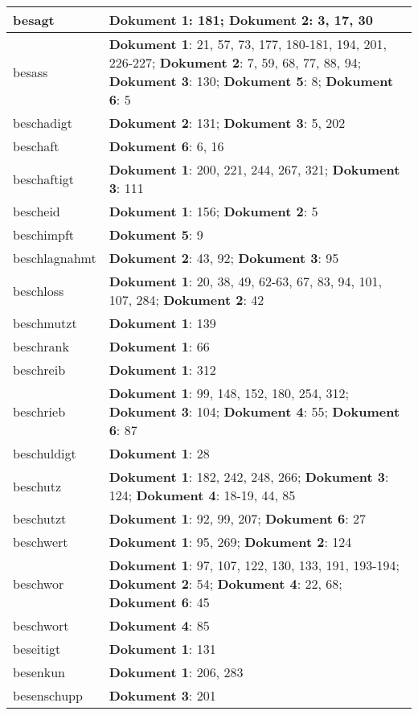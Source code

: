 \documentclass[a5paper]{article}
\begin{document}
\begin{longtable}[l]{|l|p{3in}|}
\hline
besagt & \textbf{Dokument 1}: 181; \textbf{Dokument 2}: 3, 17, 30 \\
\hline
besass & \textbf{Dokument 1}: 21, 57, 73, 177, 180-181, 194, 201, 226-227; \textbf{Dokument 2}: 7, 59, 68, 77, 88, 94; \textbf{Dokument 3}: 130; \textbf{Dokument 5}: 8; \textbf{Dokument 6}: 5 \\
\hline
beschadigt & \textbf{Dokument 2}: 131; \textbf{Dokument 3}: 5, 202 \\
\hline
beschaft & \textbf{Dokument 6}: 6, 16 \\
\hline
beschaftigt & \textbf{Dokument 1}: 200, 221, 244, 267, 321; \textbf{Dokument 3}: 111 \\
\hline
bescheid & \textbf{Dokument 1}: 156; \textbf{Dokument 2}: 5 \\
\hline
beschimpft & \textbf{Dokument 5}: 9 \\
\hline
beschlagnahmt & \textbf{Dokument 2}: 43, 92; \textbf{Dokument 3}: 95 \\
\hline
beschloss & \textbf{Dokument 1}: 20, 38, 49, 62-63, 67, 83, 94, 101, 107, 284; \textbf{Dokument 2}: 42 \\
\hline
beschmutzt & \textbf{Dokument 1}: 139 \\
\hline
beschrank & \textbf{Dokument 1}: 66 \\
\hline
beschreib & \textbf{Dokument 1}: 312 \\
\hline
beschrieb & \textbf{Dokument 1}: 99, 148, 152, 180, 254, 312; \textbf{Dokument 3}: 104; \textbf{Dokument 4}: 55; \textbf{Dokument 6}: 87 \\
\hline
beschuldigt & \textbf{Dokument 1}: 28 \\
\hline
beschutz & \textbf{Dokument 1}: 182, 242, 248, 266; \textbf{Dokument 3}: 124; \textbf{Dokument 4}: 18-19, 44, 85 \\
\hline
beschutzt & \textbf{Dokument 1}: 92, 99, 207; \textbf{Dokument 6}: 27 \\
\hline
beschwert & \textbf{Dokument 1}: 95, 269; \textbf{Dokument 2}: 124 \\
\hline
beschwor & \textbf{Dokument 1}: 97, 107, 122, 130, 133, 191, 193-194; \textbf{Dokument 2}: 54; \textbf{Dokument 4}: 22, 68; \textbf{Dokument 6}: 45 \\
\hline
beschwort & \textbf{Dokument 4}: 85 \\
\hline
beseitigt & \textbf{Dokument 1}: 131 \\
\hline
besenkun & \textbf{Dokument 1}: 206, 283 \\
\hline
besenschupp & \textbf{Dokument 3}: 201 \\

\end{longtable}
\end{document}

